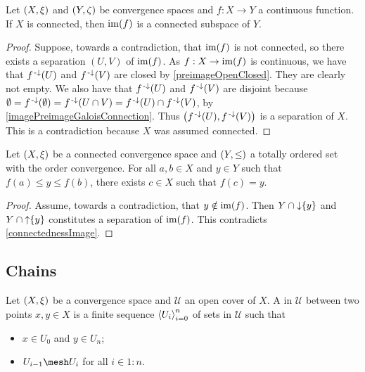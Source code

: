 \begin{proposition} \label{connectednessImage}
Let $\sSet{X,\xi}$ and $\sSet{Y,\zeta}$ be convergence spaces and $f:X\to Y$ a continuous function. If $X$ is connected, then $\operatorname{im}(f)$ is a connected subspace of $Y$.
\end{proposition}
\begin{proof}
Suppose, towards a contradiction, that $\operatorname{im}(f)$ is not connected, so there exists a separation $(U,V)$ of $\operatorname{im}(f)$. As $f: X\to \operatorname{im}(f)$ is continuous, we have that $f^{\text{\hspace{0.15em}-}\downarrow}(U)$ and $f^{{\text{\hspace{0.15em}-}\downarrow}}(V)$ are closed by \ref{preimageOpenClosed}. They are clearly not empty. We also have that $f^{\text{\hspace{0.15em}-}\downarrow}(U)$ and $f^{{\text{\hspace{0.15em}-}\downarrow}}(V)$ are disjoint because $\emptyset = f^{\text{\hspace{0.15em}-}\downarrow}(\emptyset) = f^{\text{\hspace{0.15em}-}\downarrow}(U\cap V) = f^{\text{\hspace{0.15em}-}\downarrow}(U)\cap f^{\text{\hspace{0.15em}-}\downarrow}(V)$, by \ref{imagePreimageGaloisConnection}. Thus $\big(f^{\text{\hspace{0.15em}-}\downarrow}(U), f^{\text{\hspace{0.15em}-}\downarrow}(V)\big)$ is a separation of $X$. This is a contradiction because $X$ was assumed connected.
\end{proof}

\begin{proposition} \label{generalisedIntermediateValueTheorem}
Let $\sSet{X,\xi}$ be a connected convergence space and $\sSet{Y, \leq}$ a totally ordered set with the order convergence. For all $a,b\in X$ and $y\in Y$ such that $f(a) \leq y \leq f(b)$, there exists $c\in X$ such that $f(c) = y$.
\end{proposition}
\begin{proof}
Assume, towards a contradiction, that $y\notin \operatorname{im}(f)$. Then $Y\cap \operatorname{\downarrow} \{y\}$ and $Y\cap \operatorname{\uparrow} \{y\}$ constitutes a separation of $\operatorname{im}(f)$. This contradicts \ref{connectednessImage}.
\end{proof}

\subsection{Chains}
\begin{definition}
Let $\sSet{X,\xi}$ be a convergence space and $\mathcal{U}$ an open cover of $X$. A  in $\mathcal{U}$ between two points $x,y\in X$ is a finite sequence $\left\langle U_i \right\rangle_{i=0}^n$ of sets in $\mathcal{U}$ such that
\begin{itemize}
\item $x\in U_0$ and $y\in U_n$;
\item $U_{i-1}\mesh U_i$ for all $i\in 1:n$.
\end{itemize}
\end{definition}

